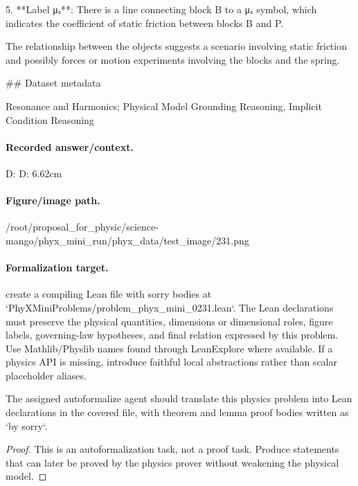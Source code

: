 5. **Label μₛ**: There is a line connecting block B to a μₛ symbol, which indicates the coefficient of static friction between blocks B and P.

The relationship between the objects suggests a scenario involving static friction and possibly forces or motion experiments involving the blocks and the spring.

\#\# Dataset metadata

Resonance and Harmonics; Physical Model Grounding Reasoning, Implicit Condition Reasoning

\paragraph{Recorded answer/context.}
D: D: 6.62cm

\paragraph{Figure/image path.}
/root/proposal\_for\_physic/science-mango/phyx\_mini\_run/phyx\_data/test\_image/231.png

\paragraph{Formalization target.}
create a compiling Lean file with sorry bodies at `PhyXMiniProblems/problem\_phyx\_mini\_0231.lean`. The Lean declarations must preserve the physical quantities, dimensions or dimensional roles, figure labels, governing-law hypotheses, and final relation expressed by this problem.
Use Mathlib/Physlib names found through LeanExplore where available. If a physics API is missing, introduce faithful local abstractions rather than scalar placeholder aliases.

\begin{theorem}
\label{thm:physics:phyx_mini_0231:target}
The assigned autoformalize agent should translate this physics problem into Lean declarations in the covered file, with theorem and lemma proof bodies written as `by sorry`.
\end{theorem}
\begin{proof}
This is an autoformalization task, not a proof task. Produce statements that can later be proved by the physics prover without weakening the physical model.
\end{proof}

